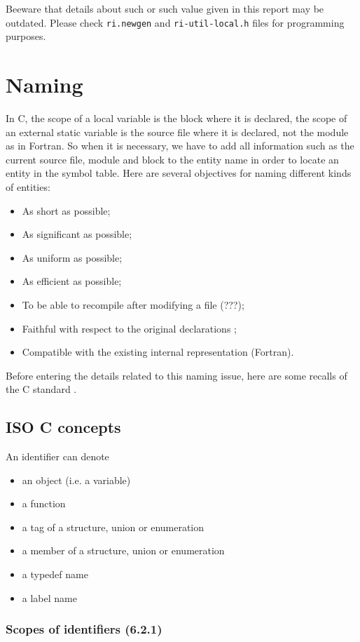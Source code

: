 \documentclass[a4paper]{report}
\begin{document}
Beeware that details about such or such value given in this report may
be outdated. Please check \verb/ri.newgen/ and \verb/ri-util-local.h/
files for programming purposes.


\chapter{Naming}
\label{chpater:naming}

In C, the scope of a local variable is the block where it is declared,
the scope of an external static variable is the source file where it
is declared, not the module as in Fortran. So when it is necessary, we
have to add all information such as the current source file, module
and block to the entity name in order to locate an entity in the
symbol table. Here are several objectives for naming different kinds
of entities:
\begin{itemize}
\item As short as possible;
\item As significant as possible;
\item As uniform as possible;
\item As efficient as possible;
\item To be able to recompile after modifying a file (???);
\item Faithful with respect to the original declarations ;
\item Compatible with the existing internal representation (Fortran).  
\end{itemize}
Before entering the details related to this naming issue, here are some
recalls of the C standard \cite{ISOC}.

\section{ISO C concepts}

An identifier can denote
\begin{itemize}
\item an object (i.e. a variable)
\item a function
\item a tag of a structure, union or enumeration
\item a member of a structure, union or enumeration
\item a typedef name
\item a label name
\end{itemize}

\subsection{Scopes of identifiers (6.2.1)}
\end{document}
